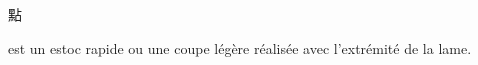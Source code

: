 \section{\Dian}
\Dian{} \begin{CJK*}{UTF8}{bsmi}點\end{CJK*} est un estoc rapide ou une coupe légère réalisée avec l'extrémité de la lame.
